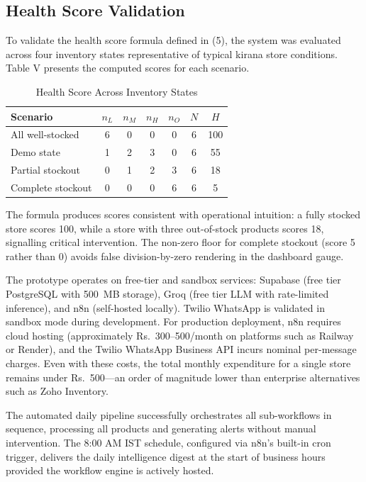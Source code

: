 \documentclass[journal]{IEEEtran}
\begin{document}
\subsection*{Health Score Validation}
To validate the health score formula defined in (5), 
the system was evaluated across four inventory states 
representative of typical kirana store conditions. 
Table V presents the computed scores for each scenario.

\begin{table}[htbp]
\centering
\caption{Health Score Across Inventory States}
\label{tab:healthscores}
\renewcommand{\arraystretch}{1.4}
\begin{tabular}{lcccccc}
\toprule
\textbf{Scenario} & $n_L$ & $n_M$ & $n_H$ & $n_O$ & $N$ & $H$ \\
\midrule
All well-stocked   & 6 & 0 & 0 & 0 & 6 & 100 \\
Demo state         & 1 & 2 & 3 & 0 & 6 & 55  \\
Partial stockout   & 0 & 1 & 2 & 3 & 6 & 18  \\
Complete stockout  & 0 & 0 & 0 & 6 & 6 & 5   \\
\bottomrule
\end{tabular}
\end{table}

The formula produces scores consistent with operational 
intuition: a fully stocked store scores 100, while a 
store with three out-of-stock products scores 18, 
signalling critical intervention. The non-zero floor 
for complete stockout (score 5 rather than 0) avoids 
false division-by-zero rendering in the dashboard gauge.

The prototype operates on free-tier and sandbox services: Supabase (free tier PostgreSQL with 500~MB storage), Groq (free tier LLM with rate-limited inference), and n8n (self-hosted locally). Twilio WhatsApp is validated in sandbox mode during development. For production deployment, n8n requires cloud hosting (approximately Rs.~300--500/month on platforms such as Railway or Render), and the Twilio WhatsApp Business API incurs nominal per-message charges. Even with these costs, the total monthly expenditure for a single store remains under Rs.~500---an order of magnitude lower than enterprise alternatives such as Zoho Inventory.

The automated daily pipeline successfully orchestrates all sub-workflows in sequence, processing all products and generating alerts without manual intervention. The 8:00 AM IST schedule, configured via n8n's built-in cron trigger, delivers the daily intelligence digest at the start of business hours provided the workflow engine is actively hosted.
\end{document}
